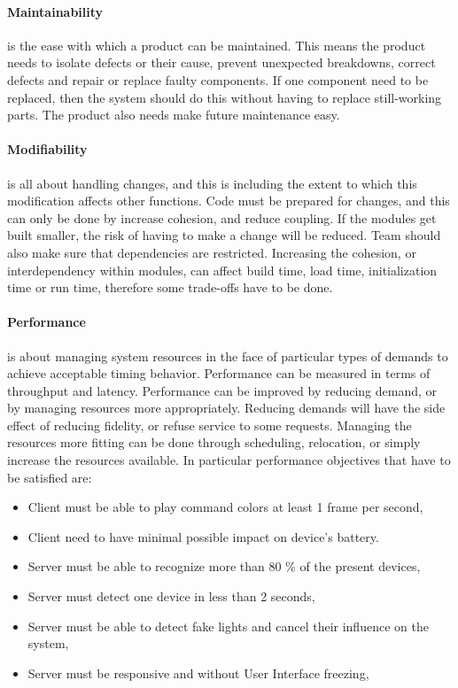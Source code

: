 \paragraph{Maintainability}
is the ease with which a product can be maintained. This means the product needs to isolate defects or their cause, prevent unexpected breakdowns, correct defects and repair or replace faulty components. If one component need to be replaced, then the system should do this without having to replace still-working parts. The product also needs make future maintenance easy. 

\paragraph{Modifiability}
is all about handling changes, and this is including the extent to which this modification affects other functions. 
Code must be prepared for changes, and this can only be done by increase cohesion, and reduce coupling. 
If the modules get built smaller, the risk of having to make a change will be reduced. 
Team should also make sure that dependencies are restricted. 
Increasing the cohesion, or interdependency within modules, can affect build time, load time, initialization time or run time, therefore some trade-offs have to be done.

\paragraph{Performance}
is about managing system resources in the face of particular types of demands to achieve acceptable timing behavior.
Performance can be measured in terms of throughput and latency. 
Performance can be improved by reducing demand, or by managing resources more appropriately. 
Reducing demands will have the side effect of reducing fidelity, or refuse service to some requests. 
Managing the resources more fitting can be done through scheduling, relocation, or simply increase the resources available.
In particular performance objectives that have to be satisfied are:
\begin{itemize}
\item Client must be able to play command colors at least 1 frame per second,
\item Client need to have minimal possible impact on device's battery. 
\item Server must be able to recognize more than 80 \% of the present devices,
\item Server must detect one device in less than 2 seconds,
\item Server must be able to detect fake lights and cancel their influence on the system,
\item Server must be responsive and without User Interface freezing,
\end{itemize}

